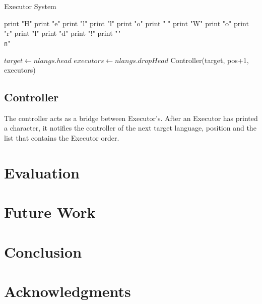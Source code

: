 \documentclass[11pt]{article}
\begin{document}
\begin{algorithm}
\caption{Executor System}
\label{Special Edition}
\begin{algorithmic}[2]
 print "H"
 print "e"
 print "l" 
 print "l"
 print "o"
 print " "
 print "W"
 print "o"
 print "r"
 print "l" 
 print "d"
 print "!"
 print "\texttt{\char`\\n}"
\EndIf
\EndProcedure

 \State $target\gets nlangs.head$
\EndIf
\State $executors\gets nlangs.dropHead$
\State Controller(target,  pos+1, executors)
\EndProcedure
\end{algorithmic}
\end{algorithm}

\subsection{Controller}
The controller acts as a bridge between Executor's. After an Executor has printed a character, it notifies the controller of the next target language, position and the list that contains the Executor order.


\section{Evaluation}

\section{Future Work}

\section{Conclusion}

\section*{Acknowledgments}




\end{document}
